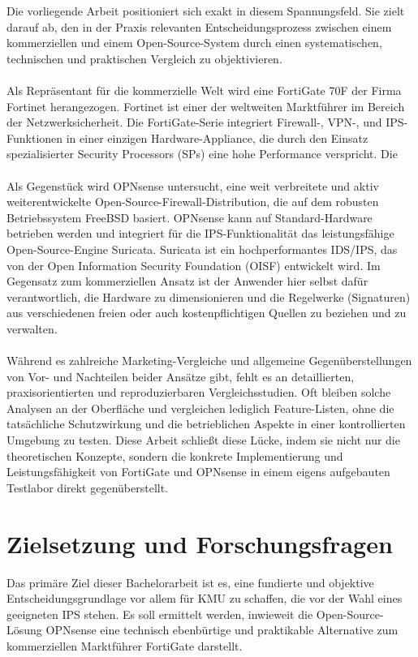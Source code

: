Die vorliegende Arbeit positioniert sich exakt in diesem Spannungsfeld. Sie zielt darauf ab, den in der Praxis relevanten Entscheidungsprozess zwischen einem kommerziellen und einem Open-Source-System durch einen systematischen, technischen und praktischen Vergleich zu objektivieren.
\\\\
Als Repräsentant für die kommerzielle Welt wird eine FortiGate 70F der Firma Fortinet herangezogen. Fortinet ist einer der weltweiten Marktführer im Bereich der Netzwerksicherheit. Die FortiGate-Serie integriert Firewall-, VPN-, und IPS-Funktionen in einer einzigen Hardware-Appliance, die durch den Einsatz spezialisierter Security Processors (SPs) eine hohe Performance verspricht. Die 
\\\\
Als Gegenstück wird OPNsense untersucht, eine weit verbreitete und aktiv weiterentwickelte Open-Source-Firewall-Distribution, die auf dem robusten Betriebssystem FreeBSD basiert. OPNsense kann auf Standard-Hardware betrieben werden und integriert für die IPS-Funktionalität das leistungsfähige Open-Source-Engine Suricata. Suricata ist ein hochperformantes IDS/IPS, das von der Open Information Security Foundation (OISF) entwickelt wird. Im Gegensatz zum kommerziellen Ansatz ist der Anwender hier selbst dafür verantwortlich, die Hardware zu dimensionieren und die Regelwerke (Signaturen) aus verschiedenen freien oder auch kostenpflichtigen Quellen zu beziehen und zu verwalten.
\\\\
Während es zahlreiche Marketing-Vergleiche und allgemeine Gegenüberstellungen von Vor- und Nachteilen beider Ansätze gibt, fehlt es an detaillierten, praxisorientierten und reproduzierbaren Vergleichsstudien. Oft bleiben solche Analysen an der Oberfläche und vergleichen lediglich Feature-Listen, ohne die tatsächliche Schutzwirkung und die betrieblichen Aspekte in einer kontrollierten Umgebung zu testen. Diese Arbeit schließt diese Lücke, indem sie nicht nur die theoretischen Konzepte, sondern die konkrete Implementierung und Leistungsfähigkeit von FortiGate und OPNsense in einem eigens aufgebauten Testlabor direkt gegenüberstellt.

\section{Zielsetzung und Forschungsfragen}

Das primäre Ziel dieser Bachelorarbeit ist es, eine fundierte und objektive Entscheidungsgrundlage vor allem für KMU zu schaffen, die vor der Wahl eines geeigneten IPS stehen. Es soll ermittelt werden, inwieweit die Open-Source-Lösung OPNsense eine technisch ebenbürtige und praktikable Alternative zum kommerziellen Marktführer FortiGate darstellt.\\


